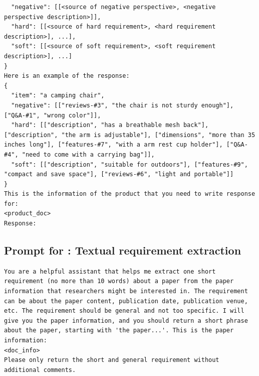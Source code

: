 \begin{mdframed}[backgroundcolor=cyan!5, linecolor=black, linewidth=2pt, 
                innerleftmargin=10pt, innerrightmargin=10pt, 
                innertopmargin=3pt, innerbottommargin=10pt]
\begin{lstlisting}
  "negative": [[<source of negative perspective>, <negative perspective description>]],
  "hard": [[<source of hard requirement>, <hard requirement description>], ...],
  "soft": [[<source of soft requirement>, <soft requirement description>], ...]
}
Here is an example of the response: 
{
  "item": "a camping chair",
  "negative": [["reviews-#3", "the chair is not sturdy enough"], ["Q&A-#1", "wrong color"]],
  "hard": [["description", "has a breathable mesh back"], ["description", "the arm is adjustable"], ["dimensions", "more than 35 inches long"], ["features-#7", "with a arm rest cup holder"], ["Q&A-#4", "need to come with a carrying bag"]],
  "soft": [["description", "suitable for outdoors"], ["features-#9", "compact and save space"], ["reviews-#6", "light and portable"]]
}
This is the information of the product that you need to write response for:
<product_doc>
Response: 
\end{lstlisting}
\end{mdframed}

\begin{mdframed}[backgroundcolor=pink!25, linecolor=black, linewidth=2pt, innerleftmargin=10pt, innerrightmargin=10pt, innertopmargin=3pt, innerbottommargin=10pt]
\section*{Prompt for \magt: Textual requirement extraction}
\begin{lstlisting}
You are a helpful assistant that helps me extract one short requirement (no more than 10 words) about a paper from the paper information that researchers might be interested in. The requirement can be about the paper content, publication date, publication venue, etc. The requirement should be general and not too specific. I will give you the paper information, and you should return a short phrase about the paper, starting with 'the paper...'. This is the paper information:
<doc_info>
Please only return the short and general requirement without additional comments.
\end{lstlisting}
\end{mdframed}

